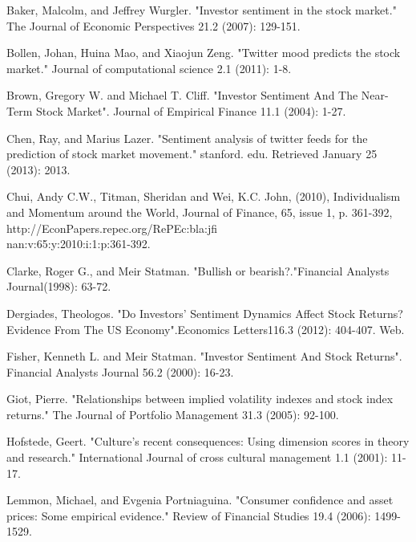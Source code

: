 Baker, Malcolm, and Jeffrey Wurgler. "Investor sentiment in the stock market." The Journal of Economic \hspace*{8ex}Perspectives 21.2 (2007): 129-151.

Bollen, Johan, Huina Mao, and Xiaojun Zeng. "Twitter mood predicts the stock market." Journal of \hspace*{8ex}computational science 2.1 (2011): 1-8.

Brown, Gregory W. and Michael T. Cliff. "Investor Sentiment And The Near-Term Stock Market". \hspace*{8ex}Journal of Empirical Finance 11.1 (2004): 1-27.

Chen, Ray, and Marius Lazer. "Sentiment analysis of twitter feeds for the prediction of stock market \hspace*{8ex}movement." stanford. edu. Retrieved January 25 (2013): 2013.

Chui, Andy C.W., Titman, Sheridan and Wei, K.C. John, (2010), Individualism and Momentum around \hspace*{8ex}the World, Journal of Finance, 65, issue 1, p. 361-392, http://EconPapers.repec.org/RePEc:bla:jfi\\\hspace*{8ex}nan:v:65:y:2010:i:1:p:361-392.

Clarke, Roger G., and Meir Statman. "Bullish or bearish?."Financial Analysts Journal(1998): 63-72.

Dergiades, Theologos. "Do Investors’ Sentiment Dynamics Affect Stock Returns? Evidence From The \hspace*{8ex}US Economy".Economics Letters116.3 (2012): 404-407. Web.

Fisher, Kenneth L. and Meir Statman. "Investor Sentiment And Stock Returns". Financial Analysts \hspace*{8ex}Journal 56.2 (2000): 16-23.

Giot, Pierre. "Relationships between implied volatility indexes and stock index returns." The Journal of \hspace*{8ex}Portfolio Management 31.3 (2005): 92-100.

Hofstede, Geert. "Culture's recent consequences: Using dimension scores in theory and research." \hspace*{8ex}International Journal of cross cultural management 1.1 (2001): 11-17.

Lemmon, Michael, and Evgenia Portniaguina. "Consumer confidence and asset prices: Some empirical \hspace*{8ex}evidence." Review of Financial Studies 19.4 (2006): 1499-1529.

